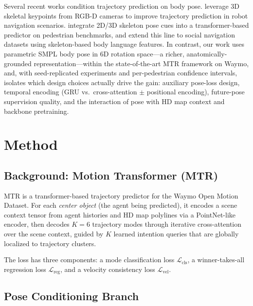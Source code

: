 \documentclass{article} %
\newcommand{\mtr}{\textsc{MTR}\xspace}
\begin{document}
Several recent works condition trajectory prediction on body pose.
\citet{salzmann2023robots} leverage 3D skeletal keypoints from RGB-D cameras
to improve trajectory prediction in robot navigation scenarios.
\citet{saadatnejad2024socialtransmotion} integrate 2D/3D skeleton pose cues
into a transformer-based predictor on pedestrian benchmarks, and
\citet{gao2025socialpose} extend this line to social navigation datasets
using skeleton-based body language features.
In contrast, our work uses parametric SMPL body pose in 6D rotation space---a
richer, anatomically-grounded representation---within the state-of-the-art MTR
framework on Waymo, and, with seed-replicated experiments and per-pedestrian
confidence intervals, isolates which design choices actually drive the gain:
auxiliary pose-loss design, temporal encoding (GRU vs.\ cross-attention $\pm$
positional encoding), future-pose supervision quality, and the interaction of
pose with HD map context and backbone pretraining.

\section{Method}
\label{sec:method}

\subsection{Background: Motion Transformer (MTR)}
\label{sec:mtr}

\mtr \citep{shi2022mtr} is a transformer-based trajectory predictor for the
Waymo Open Motion Dataset. For each \emph{center object} (the agent being predicted),
it encodes a scene context tensor from agent histories and HD map polylines via
a PointNet-like encoder, then decodes $K=6$ trajectory modes through
iterative cross-attention over the scene context, guided by $K$ learned
intention queries that are globally localized to trajectory clusters.

The loss has three components: a mode classification loss $\mathcal{L}_{\text{cls}}$,
a winner-takes-all regression loss $\mathcal{L}_{\text{reg}}$, and a velocity
consistency loss $\mathcal{L}_{\text{vel}}$.

\subsection{Pose Conditioning Branch}
\label{sec:pose_branch}
\end{document}
